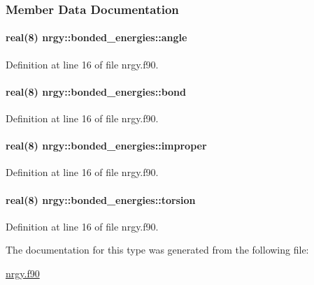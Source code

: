 \subsubsection{Member Data Documentation}
\hypertarget{structnrgy_1_1bonded__energies_aec4a2f71dff343dff4a3be24b726a6cd}{
\paragraph[{angle}]{\setlength{\rightskip}{0pt plus 5cm}real(8) nrgy\-::bonded\-\_\-energies\-::angle}}\label{structnrgy_1_1bonded__energies_aec4a2f71dff343dff4a3be24b726a6cd}


Definition at line 16 of file nrgy.\-f90.

\hypertarget{structnrgy_1_1bonded__energies_a6991660ad80264db6f036dc9a2264f15}{
\paragraph[{bond}]{\setlength{\rightskip}{0pt plus 5cm}real(8) nrgy\-::bonded\-\_\-energies\-::bond}}\label{structnrgy_1_1bonded__energies_a6991660ad80264db6f036dc9a2264f15}


Definition at line 16 of file nrgy.\-f90.

\hypertarget{structnrgy_1_1bonded__energies_aa3325a98d7f6ad228c447d75e969d37d}{
\paragraph[{improper}]{\setlength{\rightskip}{0pt plus 5cm}real(8) nrgy\-::bonded\-\_\-energies\-::improper}}\label{structnrgy_1_1bonded__energies_aa3325a98d7f6ad228c447d75e969d37d}


Definition at line 16 of file nrgy.\-f90.

\hypertarget{structnrgy_1_1bonded__energies_a847f033a2b0af8384a399a1740900d44}{
\paragraph[{torsion}]{\setlength{\rightskip}{0pt plus 5cm}real(8) nrgy\-::bonded\-\_\-energies\-::torsion}}\label{structnrgy_1_1bonded__energies_a847f033a2b0af8384a399a1740900d44}


Definition at line 16 of file nrgy.\-f90.



The documentation for this type was generated from the following file\-:\begin{DoxyCompactItemize}
\item 
\hyperlink{nrgy_8f90}{nrgy.\-f90}\end{DoxyCompactItemize}
